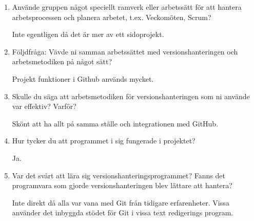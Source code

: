 \begin{enumerate}
  \item Använde gruppen något speciellt ramverk eller arbetssätt för att hantera arbetsprocessen och planera arbetet, t.ex. Veckomöten, Scrum?

  Inte egentligen då det är mer av ett sidoprojekt.

  \item Följdfråga: Vävde ni samman arbetssättet med versionshanteringen och arbetsmetodiken på något sätt?

  Projekt funktioner i Github används mycket.

  \item Skulle du säga att arbetsmetodiken för versionshanteringen som ni använde var effektiv? Varför?

  Skönt att ha allt på samma ställe och integrationen med GitHub.

  \item Hur tycker du att programmet i sig fungerade i projektet?

  Ja.

  \item Var det svårt att lära sig versionshanteringsprogrammet? Fanns det programvara som gjorde versionshanteringen blev lättare att hantera?

  Inte direkt då alla var vana med Git från tidigare erfarenheter. Vissa använder det inbyggda stödet för Git i vissa text redigerings program.

\end{enumerate}







